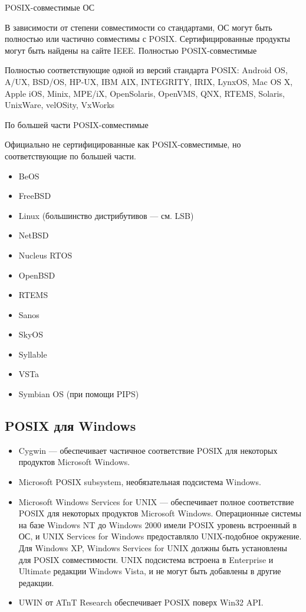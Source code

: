 POSIX-совместимые ОС

В зависимости от степени совместимости со стандартами, ОС могут быть полностью или частично совместимы с POSIX. Сертифицированные продукты могут быть найдены на сайте IEEE.
Полностью POSIX-совместимые

Полностью соответствующие одной из версий стандарта POSIX: Android OS, A/UX, BSD/OS, HP-UX, IBM AIX, INTEGRITY, IRIX, LynxOS, Mac OS X, Apple iOS, Minix, MPE/iX, OpenSolaris, OpenVMS, QNX, RTEMS, Solaris, UnixWare, velOSity, VxWorks

По большей части POSIX-совместимые

Официально не сертифицированные как POSIX-совместимые, но соответствующие по большей части.
\begin{itemize}
 \item BeOS
 \item FreeBSD
 \item Linux (большинство дистрибутивов — см. LSB)
 \item NetBSD
 \item Nucleus RTOS
 \item OpenBSD
 \item RTEMS
 \item Sanos
 \item SkyOS
 \item Syllable
 \item VSTa
 \item Symbian OS (при помощи PIPS)
\end{itemize}
\subsection{POSIX для Windows}
\begin{itemize}
\item Cygwin — обеспечивает частичное соответствие POSIX для некоторых продуктов Microsoft Windows.
\item Microsoft POSIX subsystem, необязательная подсистема Windows.
\item Microsoft Windows Services for UNIX — обеспечивает полное соответствие POSIX для некоторых продуктов Microsoft Windows. Операционные системы на базе Windows NT до Windows 2000 имели POSIX уровень встроенный в ОС, и UNIX Services for Windows предоставляло UNIX-подобное окружение. Для Windows XP, Windows Services for UNIX должны быть установлены для POSIX совместимости. UNIX подсистема встроена в Enterprise и Ultimate редакции Windows Vista, и не могут быть добавлены в другие редакции.
\item UWIN от ATnT Research обеспечивает POSIX поверх Win32 API.
\end{itemize}
